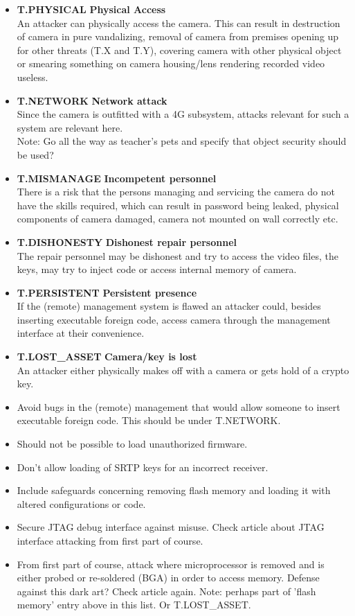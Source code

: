 \documentclass[10pt]{article}
\newcommand{\threat}[3]{\item{\textbf{T.#1} \hfill \textbf{#2} \\ #3}}
\begin{document}
      \begin{itemize}[label={}]
        \threat{PHYSICAL}{Physical Access} {
          An attacker can physically access the camera. This can result in
          destruction of camera in pure vandalizing, removal of camera from
          premises opening up for other threats (T.X and T.Y), covering camera
          with other physical object or smearing something on camera
          housing/lens rendering recorded video useless.
        }
        \threat{NETWORK}{Network attack} {
          Since the camera is outfitted with a 4G subsystem, attacks relevant for
          such a system are relevant here.
          \\ Note: Go all the way as teacher's pets and specify that object
          security should be used?
        }
        \threat{MISMANAGE}{Incompetent personnel} {
          There is a risk that the persons managing and servicing the camera do
          not have the skills required, which can result in password being
          leaked, physical components of camera damaged, camera not mounted on
          wall correctly etc.
        }
        \threat{DISHONESTY}{Dishonest repair personnel}{ %
          The repair personnel may be dishonest and try to access the video
          files, the keys, may try to inject code or access internal memory of
          camera.
        }
        \threat{PERSISTENT}{Persistent presence}{
          If the (remote) management system is flawed an attacker could,
          besides inserting executable foreign code, access camera through the
          management interface at their convenience.
        }
        \threat{LOST\_ASSET}{Camera/key is lost}{
          An attacker either physically makes off with a camera or gets hold of
          a crypto key.
        }
        \item{
          Avoid bugs in the (remote) management that would allow someone to
          insert executable foreign code. This should be under T.NETWORK.
        }
        \item{
          Should not be possible to load unauthorized firmware.
        }
        \item{
          Don't allow loading of SRTP keys for an incorrect receiver.
        }
        \item{
          Include safeguards concerning removing flash memory and loading it
          with altered configurations or code.
        }
        \item{
          Secure JTAG debug interface against misuse. Check article about
          JTAG interface attacking from first part of course.
        }
        \item{
          From first part of course, attack where microprocessor is removed
          and is either probed or re-soldered (BGA) in order to access memory.
          Defense against this dark art? Check article again. Note: perhaps
          part of 'flash memory' entry above in this list. Or T.LOST\_ASSET.
        }
      \end{itemize}
\end{document}
